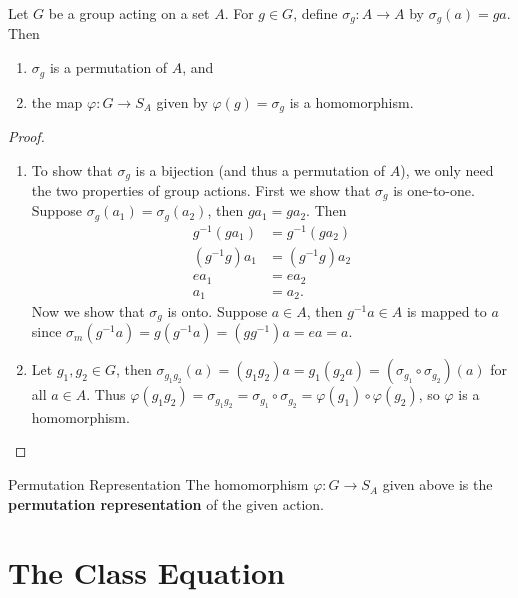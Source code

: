 \documentclass[10pt]{report}
\begin{document}
\begin{prop}
	Let $G$ be a group acting on a set $A$. For $g \in G$, define $\sigma_g:A\to A$ by $\sigma_g(a) = ga$. Then
	\begin{enumerate}
		\item $\sigma_g$ is a permutation of $A$, and
		\item the map $\varphi: G \to S_A$ given by $\varphi(g) = \sigma_g$ is a homomorphism.
	\end{enumerate}
\end{prop}
\begin{proof}
\begin{enumerate}
	\item To show that $\sigma_g$ is a bijection (and thus a permutation of $A$), we only need the two properties of group actions. First we show that $\sigma_g$ is one-to-one. Suppose $\sigma_g(a_1) = \sigma_g(a_2)$, then $ga_1=ga_2$. Then
		\begin{align*}
			g^{-1}(ga_1) &= g^{-1}(ga_2) \\
			(g^{-1}g)a_1 &= (g^{-1}g)a_2 \\
			ea_1 &= ea_2 \\
			a_1 &= a_2.
		\end{align*} Now we show that $\sigma_g$ is onto. Suppose $a \in A$, then $g^{-1}a\in A$ is mapped to $a$ since $\sigma_m(g^{-1}a) = g(g^{-1}a)=(gg^{-1})a = ea = a$.

	\item Let $g_1,g_2 \in G$, then $\sigma_{g_1g_2}(a) = (g_1g_2)a = g_1(g_2a) = (\sigma_{g_1}\circ \sigma_{g_2})(a)$ for all $a \in A$. Thus $\varphi(g_1g_2) = \sigma_{g_1g_2}=\sigma_{g_1}\circ \sigma_{g_2} = \varphi(g_1)\circ\varphi(g_2)$, so $\varphi$ is a homomorphism.
\end{enumerate}
\end{proof}

\begin{defn}{Permutation Representation}{}
The homomorphism $\varphi:G\to S_A$ given above is the \textbf{permutation representation} of the given action.
\end{defn}



\section{The Class Equation}


\end{document}
